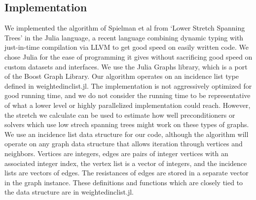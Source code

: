 \documentclass{article}
\begin{document}
\subsection*{Implementation}
We implemented the algorithm of Spielman et al from `Lower Stretch Spanning Trees' in the Julia language\cite{julia:website}, a recent language combining dynamic typing with just-in-time compilation via LLVM to get good speed on easily written code.  We chose Julia for the ease of programming it gives without sacrificing good speed on custom datasets and interfaces.  We use the Julia Graphs library\cite{julia:graphs}, which is a port of the Boost Graph Library.  Our algorithm operates on an incidence list type defined in weightedinclist.jl.  The implementation is not aggressively optimized for good running time, and we do not consider the running time to be representative of what a lower level or highly parallelized implementation could reach.  However, the stretch we calculate can be used to estimate how well preconditioners or solvers which use low strech spanning trees might work on these types of graphs.\\

We use an incidence list data structure for our code, although the algorithm will operate on any graph data structure that allows iteration through vertices and neighbors.  Vertices are integers, edges are pairs of integer vertices with an associated integer index, the vertex list is a vector of integers, and the incidence lists are vectors of edges.  The resistances of edges are stored in a separate vector in the graph instance.  These definitions and functions which are closely tied to the data structure are in weightedinclist.jl.\\
\end{document}
